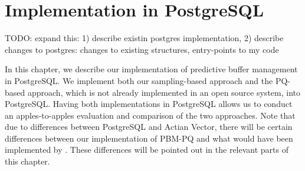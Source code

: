 
\chapter{\label{sec:pbm-pq_postgres}Implementation in P\MakeLowercase{ostgre}SQL}


TODO: expand this: 1) describe existin postgres implementation, 2) describe changes to postgres: changes to existing structures, entry-points to my code


In this chapter, we describe our implementation of predictive buffer management in PostgreSQL. We implement both our sampling-based approach and the PQ-based approach, which is not already implemented in an open source system, into PostgreSQL.
Having both implementations in PostgreSQL allows us to conduct an apples-to-apples evaluation and  comparison of the two approaches. Note that due to differences between PostgreSQL and Actian Vector, there will be certain differences between our implementation of PBM-PQ and what would have been implemented by \cite{pbm}. These differences will be pointed out in the relevant parts of this chapter.



